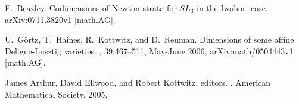 \begin{thebibliography}{1}

E.~Beazley.
\newblock Codimensions of {Newton} strata for {$SL_3$} in the {Iwahori} case.
\newblock arXiv:0711.3820v1 [math.AG].

U.~G\"ortz, T.~Haines, R.~Kottwitz, and D.~Reuman.
\newblock Dimensions of some affine {Deligne-Lusztig} varieties.
,
  39:467--511, May-June 2006, arXiv:math/0504443v1 [math.AG].

James Arthur, David Ellwood, and Robert Kottwitz, editors.
.
\newblock American Mathematical Society, 2005.

\end{thebibliography}
